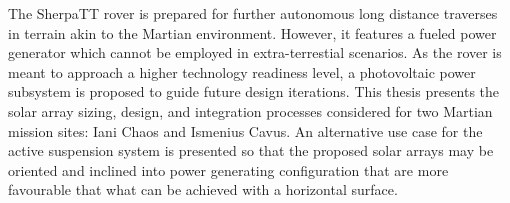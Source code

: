 \vspace{-3ex}

The SherpaTT rover is prepared for further autonomous long distance traverses in terrain akin to the Martian environment. However, it features a fueled power generator which cannot be employed in extra-terrestial scenarios. As the rover is meant to approach a higher technology readiness level, a photovoltaic power subsystem is proposed to guide future design iterations. This thesis presents the solar array sizing, design, and integration processes considered for two Martian mission sites: Iani Chaos and Ismenius Cavus. An alternative use case for the active suspension system is presented so that the proposed solar arrays may be oriented and inclined into power generating configuration that are more favourable that what can be achieved with a horizontal surface.
